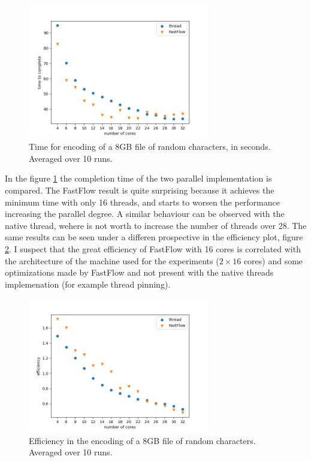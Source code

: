 \documentclass[12pt, letterpaper]{article}
\begin{document}
\begin{figure}
    \centering
    \includegraphics[width=0.7\textwidth]{./images/time_to_complete.png}
    \caption{Time for encoding of a 8GB file of random characters, in seconds. Averaged over 10 runs.}
    \label{fig:time_to_complete}
\end{figure}

In the figure \ref{fig:time_to_complete} the completion time of the two parallel implementation is compared. The FastFlow result is quite surprising because it achieves the minimum time with only 16 threads, and starts to worsen the performance increasing the parallel degree. A similar behaviour can be observed with the native thread, wehere is not worth to increase the number of threads over 28. The same results can be seen under a differen prospective in the efficiency plot, figure \ref{fig:efficiency}. I suspect that the great efficiency of FastFlow with 16 cores is correlated with the architecture of the machine used for the experiments ($2 \times 16 $ cores) and some optimizations made by FastFlow and not present with the native threads implemenation (for example thread pinning).


\begin{figure}
    \centering
    \includegraphics[width=0.7\textwidth]{./images/efficiency.png}
    \caption{Efficiency in the encoding of a 8GB file of random characters. Averaged over 10 runs.}
    \label{fig:efficiency}
\end{figure}
\end{document}
